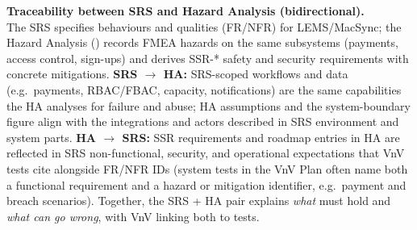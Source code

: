 \documentclass{article}
\begin{document}
\noindent\textbf{Traceability between SRS and Hazard Analysis (bidirectional).}\\
The SRS specifies behaviours and qualities (FR/NFR) for LEMS/MacSync; the Hazard Analysis
() records FMEA hazards on the same subsystems (payments,
access control, sign-ups) and derives SSR-* safety and security requirements with concrete mitigations.
\textbf{SRS $\rightarrow$ HA:} SRS-scoped workflows and data (e.g.\ payments, RBAC/FBAC, capacity, notifications)
are the same capabilities the HA analyses for failure and abuse; HA assumptions and the system-boundary
figure align with the integrations and actors described in SRS environment and system parts.
\textbf{HA $\rightarrow$ SRS:} SSR requirements and roadmap entries in HA are reflected in SRS non-functional,
security, and operational expectations that VnV tests cite alongside FR/NFR IDs (system tests in the VnV Plan
often name both a functional requirement and a hazard or mitigation identifier, e.g.\ payment and breach scenarios).
Together, the SRS + HA pair explains \emph{what} must hold and \emph{what can go wrong}, with VnV linking both to tests.
\end{document}
